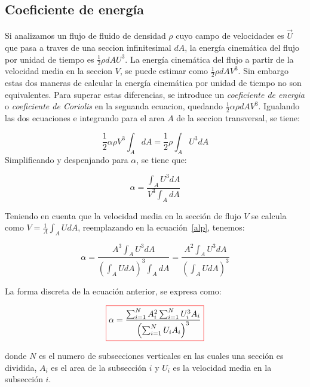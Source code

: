 \documentclass[11pt, oneside]{article}
\begin{document}
\subsection{Coeficiente de energ\'ia}
Si analizamos un flujo de fluido de densidad $\rho$ cuyo campo de velocidades es $\vec{U}$ que pasa a traves de una seccion infinitesimal $dA$, la energ\'ia cinem\'atica del flujo por unidad de tiempo es $\frac{1}{2}\rho dA U^3$. La energ\'ia cinem\'atica del flujo a partir de la velocidad media en la seccion $V$, se puede estimar como  $\frac{1}{2}\rho dA V^3$. Sin embargo estas dos maneras de calcular la energ\'ia cinem\'atica por unidad de tiempo no son equivalentes. Para superar estas diferencias, se introduce un \emph{coeficiente de energia} o \emph{coeficiente de Coriolis} en la seguanda ecuacion, quedando $\frac{1}{2}\alpha \rho dA V^3$. Igualando las dos ecuaciones e integrando para el area $A$ de la seccion transversal, se tiene:

$$
\frac{1}{2}\alpha\rho V^3 \int_A dA  = \frac{1}{2}\rho \int_A U^3 dA 
$$
Simplificando y despenjando para $\alpha$, se tiene que:

\begin{equation}
\alpha = \frac{\int_A U^3 dA}{V^3 \int_A dA}
\label{alp}
\end{equation}

Teniendo en cuenta que la velocidad media en la secci\'on de flujo $V$ se calcula como $V=\frac{1}{A}\int_A U dA$, reemplazando en la ecuaci\'on~\ref{alp}, tenemos:

\begin{equation}
\alpha = \frac{A^3 \int_A U^3 dA}{\left(\int_A U dA \right)^3 \int_A dA}= \frac{A^2 \int_A U^3 dA}{\left(\int_A U dA \right)^3 }
\label{alp2}
\end{equation}

La forma discreta de la ecuaci\'on anterior, se expresa como:

\begin{equation}
\color{red}\boxed{\color{black} \alpha = \frac{\sum_{i=1}^{N}A_i^2 \sum_{i=1}^{N} U_i^3 A_i} {\left(\sum_{i=1}^{N} U_i A_i \right)^3 }}
\label{alp3}
\end{equation}

donde $N$ es el numero de subsecciones verticales en las cuales una secci\'on es dividida, $A_i$ es el area de la subsecci\'on $i$ y $U_i$ es la velocidad media en la subsecci\'on $i$.
\end{document}
